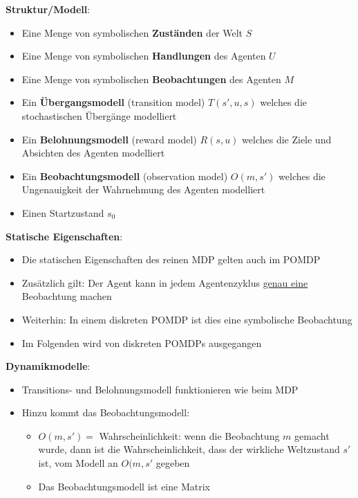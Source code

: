\textbf{Struktur/Modell}:
\begin{itemize}
	\item Eine Menge von symbolischen \textbf{Zust\"anden} der Welt $S$
	\item Eine Menge von symbolischen \textbf{Handlungen} des Agenten $U$
	\item Eine Menge von symbolischen \textbf{Beobachtungen} des Agenten $M$
	\item Ein \textbf{\"Ubergangsmodell} (transition model) $T(s', u, s)$ welches die stochastischen \"Uberg\"ange modelliert
	\item Ein \textbf{Belohnungsmodell} (reward model) $R(s,u)$ welches die Ziele und Absichten des Agenten modelliert
	\item Ein \textbf{Beobachtungsmodell} (observation model) $O(m, s')$ welches die Ungenauigkeit der Wahrnehmung des Agenten modelliert
	\item Einen Startzustand $s_0$
\end{itemize}

\textbf{Statische Eigenschaften}:
\begin{itemize}
	\item Die statischen Eigenschaften des reinen MDP gelten auch im POMDP
	\item Zusätzlich gilt: Der Agent kann in jedem Agentenzyklus \underline{genau eine} Beobachtung machen
	\item Weiterhin: In einem diskreten POMDP ist dies eine symbolische Beobachtung
	\item Im Folgenden wird von diskreten POMDPs ausgegangen
\end{itemize}

\textbf{Dynamikmodelle}:
\begin{itemize}
	\item Transitions- und Belohnungsmodell funktionieren wie beim MDP
	\item Hinzu kommt das Beobachtungsmodell:
	\begin{itemize}
		\item $O(m,s') =$ Wahrscheinlichkeit: wenn die Beobachtung $m$ gemacht wurde, dann ist die Wahrscheinlichkeit, dass der wirkliche Weltzustand $s'$ ist, vom Modell an $O(m,s'$ gegeben
		\item Das Beobachtungsmodell ist eine Matrix
	\end{itemize}
\end{itemize}

